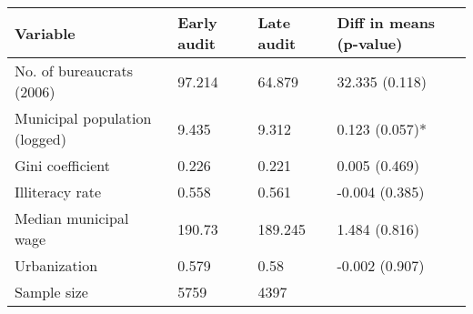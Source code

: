 
\begin{tabular}{llll}
\toprule
Variable & Early audit & Late audit & Diff in means (p-value)\\
\midrule
No. of bureaucrats (2006) & 97.214 & 64.879 & 32.335 (0.118)\\
Municipal population (logged) & 9.435 & 9.312 & 0.123 (0.057)*\\
Gini coefficient & 0.226 & 0.221 & 0.005 (0.469)\\
Illiteracy rate & 0.558 & 0.561 & -0.004 (0.385)\\
Median municipal wage & 190.73 & 189.245 & 1.484 (0.816)\\
\addlinespace
Urbanization & 0.579 & 0.58 & -0.002 (0.907)\\
Sample size & 5759 & 4397 & \\
\bottomrule
\end{tabular}